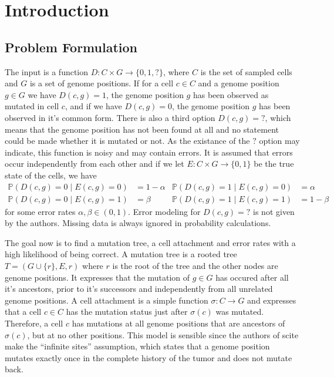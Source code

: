 \chapter{Introduction}
\label{ch:introduction}

\section{Problem Formulation}

The input is a function $D: C \times G \rightarrow \{0, 1, ?\}$, where $C$ is the set of sampled cells and $G$ is a set of genome positions. If for a cell $c \in C$ and a genome position $g \in G$ we have $D(c, g) = 1$, the genome position $g$ has been observed as mutated in cell $c$, and if we have $D(c, g) = 0$, the genome position $g$ has been observed in it's common form. There is also a third option $D(c, g) = ?$, which means that the genome position has not been found at all and no statement could be made whether it is mutated or not. As the existance of the $?$ option may indicate, this function is noisy and may contain errors. It is assumed that errors occur independently from each other and if we let $E: C \times G \rightarrow \{0, 1\}$ be the true state of the cells, we have
\begin{align*}
    \mathbb{P}(D(c, g) = 0 \mid E(c, g) = 0) &= 1 - \alpha & \mathbb{P}(D(c, g) = 1 \mid E(c, g) = 0) &= \alpha \\
    \mathbb{P}(D(c, g) = 0 \mid E(c, g) = 1) &= \beta & \mathbb{P}(D(c, g) = 1 \mid E(c, g) = 1) &= 1 - \beta
\end{align*}
for some error rates $\alpha, \beta \in (0, 1)$. Error modeling for $D(c, g) = ?$ is not given by the authors. Missing data is always ignored in probability calculations.

The goal now is to find a mutation tree, a cell attachment and error rates with a high likelihood of being correct. A mutation tree is a rooted tree $T = (G \cup \{r\}, E, r)$ where $r$ is the root of the tree and the other nodes are genome positions. It expresses that the mutation of $g \in G$ has occured after all it's ancestors, prior to it's successors and independently from all unrelated genome positions. A cell attachment is a simple function $\sigma: C \rightarrow G$ and expresses that a cell $c \in C$ has the mutation status just after $\sigma(c)$ was mutated. Therefore, a cell $c$ has mutations at all genome positions that are ancestors of $\sigma(c)$, but at no other positions. This model is sensible since the authors of \ac{scite} make the ``infinite sites'' assumption, which states that a genome position mutates exactly once in the complete history of the tumor and does not mutate back.

